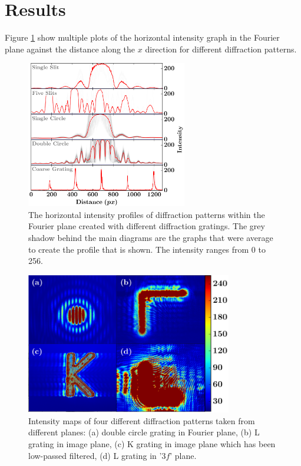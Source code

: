 \documentclass[twocolumn]{revtex4}
\begin{document}
\section{Results}
\vspace{-2ex}
Figure \ref{horizontal_profiles} show multiple plots of the horizontal intensity graph in the Fourier plane against the distance along the $x$ direction for different diffraction patterns.
\begin{figure}[!h]
\begin{center}
\includegraphics[width=7cm]{results/horizontal_intensity_profiles}
\caption[]{The horizontal intensity profiles of diffraction patterns within the Fourier plane created with different diffraction gratings. The grey shadow behind the main diagrams are the graphs that were average to create the profile that is shown. The intensity ranges from 0 to 256.}
\label{horizontal_profiles}
\end{center}
\end{figure}

\begin{figure}[!h]
\begin{center}
\includegraphics[width=9cm]{results/collage}
\caption[]{Intensity maps of four different diffraction patterns taken from different planes: (a) double circle grating in Fourier plane, (b) L grating in image plane, (c) K grating in image plane which has been low-passed filtered, (d) L grating in '$3f$' plane.}
\end{center}
\end{figure}
\end{document}

